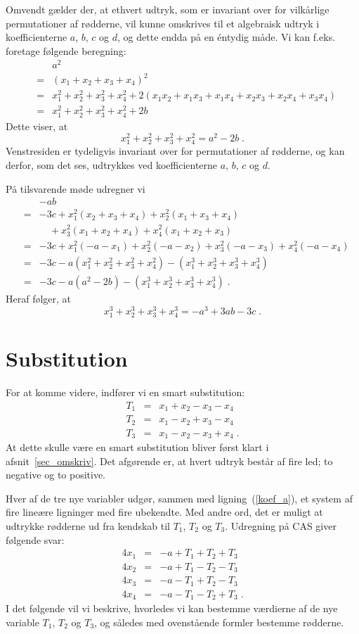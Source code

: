 \documentclass[12pt,oneside,a4paper]{article}
\newcommand{\bas}{\begin{eqnarray*}}
\newcommand{\eas}{\end{eqnarray*}}
\newcommand{\bea}{\begin{eqnarray}}
\newcommand{\eea}{\end{eqnarray}}
\begin{document}
Omvendt gælder der, at ethvert udtryk, som er invariant over for vilkårlige
permutationer af rødderne, vil kunne omskrives til et algebraisk udtryk i 
koefficienterne $a$, $b$, $c$ og $d$, og dette endda på en éntydig måde.
Vi kan f.eks. foretage følgende beregning:
\bas
 && a^2 \\
 &=& (x_1+x_2+x_3+x_4)^2  \\
 &=& x_1^2+x_2^2+x_3^2+x_4^2 + 2(x_1x_2+x_1x_3+x_1x_4 +x_2x_3+x_2x_4+x_3x_4)\\
 &=& x_1^2+x_2^2+x_3^2+x_4^2 + 2b
\eas
Dette viser, at 
\begin{equation}
    x_1^2 + x_2^2 + x_3^2 + x_4^2 = a^2 - 2b\;.
\end{equation}
Venstresiden er tydeligvis invariant over for permutationer af rødderne, og
kan derfor, som det ses, udtrykkes ved koefficienterne $a$, $b$, $c$ og $d$.

På tilsvarende møde udregner vi
\bas
 && -ab \\
 &=& -3c + x_1^2(x_2+x_3+x_4) + x_2^2(x_1+x_3+x_4) \\
 && \quad + x_3^2(x_1+x_2+x_4) + x_4^2(x_1+x_2+x_3) \\
 &=& -3c + x_1^2(-a-x_1) + x_2^2(-a-x_2) + x_3^2(-a-x_3) + x_4^2(-a-x_4) \\
 &=& -3c - a(x_1^2+x_2^2+x_3^2+x_4^2) - (x_1^3+x_2^3+x_3^3+x_4^3) \\
 &=& -3c - a(a^2-2b) - (x_1^3+x_2^3+x_3^3+x_4^3) \;.
\eas
Heraf følger, at 
\begin{equation}
x_1^3+x_2^3+x_3^3+x_4^3 = -a^3 + 3ab - 3c \;.
\end{equation}

\section{Substitution} \label{sec_subst}
For at komme videre, indfører vi en smart substitution:
\bea
    T_1 &=& x_1 + x_2 - x_3 - x_4 \label{subst_t1}\\
    T_2 &=& x_1 - x_2 + x_3 - x_4 \label{subst_t2}\\
    T_3 &=& x_1 - x_2 - x_3 + x_4 \label{subst_t3}\;.
\eea
At dette skulle være en smart substitution bliver først klart i
afsnit~\ref{sec_omskriv}.  Det afgørende er, at hvert udtryk består af fire
led; to negative og to positive.

Hver af de tre nye variabler udgør, sammen med ligning~(\ref{koef_a}), et
system af fire lineære ligninger med fire ubekendte.  Med andre ord, det er
muligt at udtrykke rødderne ud fra kendskab til $T_1$, $T_2$ og $T_3$.
Udregning på CAS giver følgende svar:
\bea
    4x_1 &=& -a + T_1 + T_2 + T_3 \label{x1} \\
    4x_2 &=& -a + T_1 - T_2 - T_3 \label{x2} \\
    4x_3 &=& -a - T_1 + T_2 - T_3 \label{x3} \\
    4x_4 &=& -a - T_1 - T_2 + T_3 \label{x4} \;.
\eea
I det følgende vil vi beskrive, hvorledes vi kan bestemme værdierne af de nye
variable $T_1$, $T_2$ og $T_3$, og således med ovenstående formler bestemme
rødderne.
\end{document}
